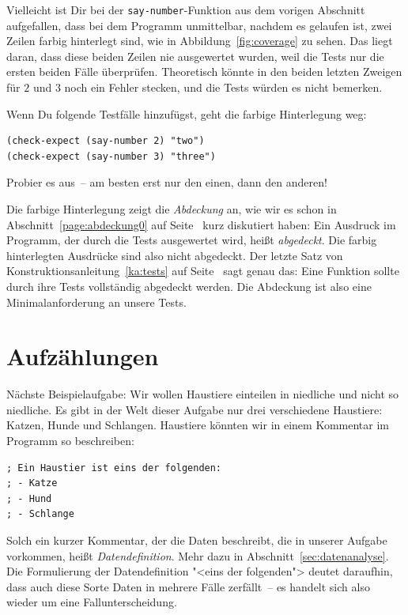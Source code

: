 Vielleicht ist Dir bei der \lstinline{say-number}-Funktion aus dem
vorigen Abschnitt aufgefallen, dass bei dem Programm unmittelbar, nachdem
es gelaufen ist, zwei Zeilen farbig
hinterlegt sind, wie in Abbildung~\ref{fig:coverage} zu sehen.  Das liegt
daran, dass diese beiden Zeilen nie ausgewertet wurden, weil die
Tests nur die ersten beiden Fälle überprüfen.  Theoretisch
könnte in den beiden letzten Zweigen für $2$ und $3$ noch ein Fehler
stecken, und die Tests würden es nicht bemerken.

Wenn Du folgende Testfälle hinzufügst, geht die farbige Hinterlegung weg:
%
\begin{lstlisting}
(check-expect (say-number 2) "two")
(check-expect (say-number 3) "three")
\end{lstlisting}
%
Probier es aus~-- am besten erst nur den einen, dann den anderen!

Die farbige Hinterlegung zeigt die \textit{Abdeckung} an, wie wir es
schon in Abschnitt~\ref{page:abdeckung0} auf
Seite~\pageref{page:abdeckung0} kurz diskutiert haben: Ein Ausdruck im
Programm, der durch die Tests ausgewertet wird, heißt
\textit{abgedeckt}.  Die farbig hinterlegten Ausdrücke sind also nicht
abgedeckt.  Der letzte Satz von Konstruktionsanleitung~\ref{ka:tests}
auf Seite~\pageref{ka:tests} sagt genau das: Eine Funktion sollte
durch ihre Tests vollständig abgedeckt werden.  Die Abdeckung ist also
eine Minimalanforderung an unsere Tests.

\section{Aufzählungen}

%
Nächste Beispielaufgabe: Wir wollen Haustiere einteilen in niedliche
und nicht so niedliche.  Es gibt in der Welt dieser Aufgabe nur drei
verschiedene Haustiere: Katzen, Hunde und Schlangen.  Haustiere
könnten wir in einem Kommentar im Programm so beschreiben:
%
\label{sec:datendefinition}
\begin{lstlisting}
; Ein Haustier ist eins der folgenden:
; - Katze
; - Hund
; - Schlange
\end{lstlisting}
%
Solch ein kurzer Kommentar, der die Daten beschreibt, die in unserer
Aufgabe vorkommen, heißt
\textit{Datendefinition}.  Mehr dazu in
Abschnitt~\ref{sec:datenanalyse}.  Die Formulierung der
Datendefinition "<eins der folgenden"> deutet daraufhin, dass auch
diese Sorte Daten in mehrere Fälle zerfällt~-- es handelt sich also
wieder um eine Fallunterscheidung.

